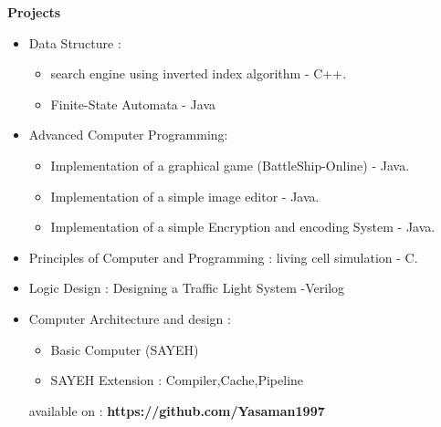 \documentclass[a4paper,12pt,final]{memoir}
\newcommand{\Sep}{\vspace{1.5em}}
\newcommand{\SmallSep}{\vspace{0.5em}}
\newcommand{\CVSection}[1]
	{\Large\textbf{#1}\par
	\SmallSep\normalsize\normalfont}
\newcommand{\CVItem}[1]
	{\textbf{\color{RoyalBlue} #1}}
\begin{document}
\Sep 

\CVSection{Projects}
\begin{itemize}
	\item Data Structure :
		\begin{itemize}[$\circ$]
		\item	search engine using inverted index algorithm - C++.
	     \item   Finite-State Automata - Java
		\end{itemize}
		
	\item Advanced Computer Programming:
		\begin{itemize}[$\circ$]
		\item  Implementation of a graphical game (BattleShip-Online) - Java.
     	\item Implementation of a simple image editor - Java.
	    \item Implementation of a simple Encryption and encoding System  - Java.
		\end{itemize}
		
	\item Principles of Computer and Programming : 
	living cell simulation - C.
   	\item Logic Design : 
   	Designing a Traffic Light System -Verilog
   	\item Computer Architecture and design :
   		\begin{itemize}[$\circ$]
		\item Basic Computer (SAYEH)
		\item SAYEH Extension : Compiler,Cache,Pipeline
		\end{itemize}
		

	available on :
  \CVItem { https://github.com/Yasaman1997}
 	
\end{itemize}

\Sep
\end{document}
